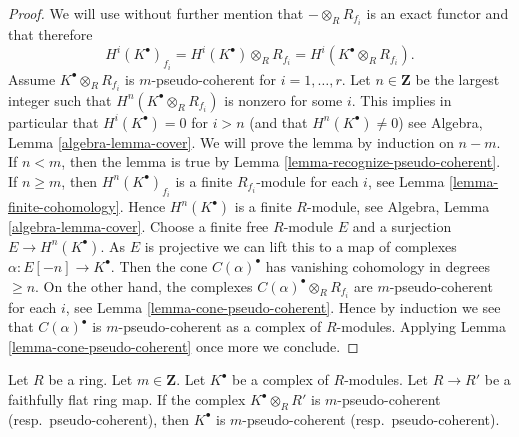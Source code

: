 \begin{proof}
We will use without further mention that $- \otimes_R R_{f_i}$ is
an exact functor and that therefore
$$
H^i(K^\bullet)_{f_i} =
H^i(K^\bullet) \otimes_R R_{f_i} = H^i(K^\bullet \otimes_R R_{f_i}).
$$
Assume $K^\bullet \otimes_R R_{f_i}$ is $m$-pseudo-coherent
for $i = 1, \ldots, r$. Let $n \in \mathbf{Z}$ be the largest
integer such that $H^n(K^\bullet \otimes_R R_{f_i})$ is nonzero
for some $i$. This implies in particular that $H^i(K^\bullet) = 0$
for $i > n$ (and that $H^n(K^\bullet) \not = 0$) see
Algebra, Lemma \ref{algebra-lemma-cover}.
We will prove the lemma by induction on $n - m$.
If $n < m$, then the lemma is true by
Lemma \ref{lemma-recognize-pseudo-coherent}.
If $n \geq m$, then $H^n(K^\bullet)_{f_i}$ is a finite $R_{f_i}$-module
for each $i$, see
Lemma \ref{lemma-finite-cohomology}.
Hence $H^n(K^\bullet)$ is a finite $R$-module, see
Algebra, Lemma \ref{algebra-lemma-cover}.
Choose a finite free $R$-module $E$ and a surjection $E \to H^n(K^\bullet)$.
As $E$ is projective we can lift this to a map of complexes
$\alpha : E[-n] \to K^\bullet$. Then the cone $C(\alpha)^\bullet$ has
vanishing cohomology in degrees $\geq n$. On the other hand, the
complexes $C(\alpha)^\bullet \otimes_R R_{f_i}$ are $m$-pseudo-coherent
for each $i$, see
Lemma \ref{lemma-cone-pseudo-coherent}.
Hence by induction we see that $C(\alpha)^\bullet$ is $m$-pseudo-coherent
as a complex of $R$-modules. Applying
Lemma \ref{lemma-cone-pseudo-coherent}
once more we conclude.
\end{proof}

\begin{lemma}
\label{lemma-flat-descent-pseudo-coherent}
Let $R$ be a ring. Let $m \in \mathbf{Z}$. Let $K^\bullet$
be a complex of $R$-modules. Let $R \to R'$ be a faithfully flat
ring map. If the complex $K^\bullet \otimes_R R'$ is $m$-pseudo-coherent
(resp.\ pseudo-coherent), then $K^\bullet$ is $m$-pseudo-coherent
(resp.\ pseudo-coherent).
\end{lemma}

